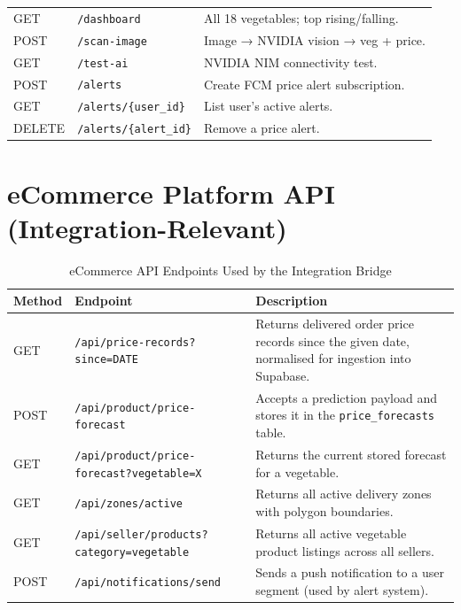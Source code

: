 \documentclass[12pt, a4paper, oneside]{report}
\begin{document}
\begin{longtable}{@{} C{1.4cm} L{6.0cm} L{6.8cm} @{}}
GET    & \texttt{/dashboard}                          & All 18 vegetables; top rising/falling. \\[3pt]
POST   & \texttt{/scan-image}                         & Image → NVIDIA vision → veg + price. \\[3pt]
GET    & \texttt{/test-ai}                            & NVIDIA NIM connectivity test. \\[3pt]
POST   & \texttt{/alerts}                             & Create FCM price alert subscription. \\[3pt]
GET    & \texttt{/alerts/\{user\_id\}}                & List user's active alerts. \\[3pt]
DELETE & \texttt{/alerts/\{alert\_id\}}               & Remove a price alert. \\
\end{longtable}

\section{eCommerce Platform API (Integration-Relevant)}

\begin{table}[H]
\centering
\caption{eCommerce API Endpoints Used by the Integration Bridge}
\label{tab:ec-api}
\begin{tabularx}{\textwidth}{@{} C{1.4cm} L{6.0cm} X @{}}
\toprule
\textbf{Method} & \textbf{Endpoint} & \textbf{Description} \\
\midrule
GET  & \texttt{/api/price-records?since=DATE}
     & Returns delivered order price records since the given date,
       normalised for ingestion into Supabase. \\[3pt]
POST & \texttt{/api/product/price-forecast}
     & Accepts a prediction payload and stores it in the
       \texttt{price\_forecasts} table. \\[3pt]
GET  & \texttt{/api/product/price-forecast?vegetable=X}
     & Returns the current stored forecast for a vegetable. \\[3pt]
GET  & \texttt{/api/zones/active}
     & Returns all active delivery zones with polygon boundaries. \\[3pt]
GET  & \texttt{/api/seller/products?category=vegetable}
     & Returns all active vegetable product listings across all sellers. \\[3pt]
POST & \texttt{/api/notifications/send}
     & Sends a push notification to a user segment (used by alert system). \\
\bottomrule
\end{tabularx}
\end{table}
\end{document}
